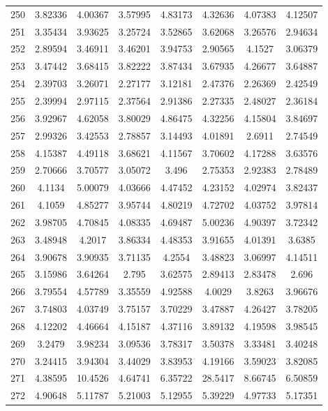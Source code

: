 \begin{center}
\begin{longtable}{cccccccc}
250 & 3.82336 & 4.00367 & 3.57995 & 4.83173 & 4.32636 & 4.07383 & 4.12507\\
251 & 3.35434 & 3.93625 & 3.25724 & 3.52865 & 3.62068 & 3.26576 & 2.94634\\
252 & 2.89594 & 3.46911 & 3.46201 & 3.94753 & 2.90565 & 4.1527 & 3.06379\\
253 & 3.47442 & 3.68415 & 3.82222 & 3.87434 & 3.67935 & 4.26677 & 3.64887\\
254 & 2.39703 & 3.26071 & 2.27177 & 3.12181 & 2.47376 & 2.26369 & 2.42549\\
255 & 2.39994 & 2.97115 & 2.37564 & 2.91386 & 2.27335 & 2.48027 & 2.36184\\
256 & 3.92967 & 4.62058 & 3.80029 & 4.86475 & 4.32256 & 4.15804 & 3.84697\\
257 & 2.99326 & 3.42553 & 2.78857 & 3.14493 & 4.01891 & 2.6911 & 2.74549\\
258 & 4.15387 & 4.49118 & 3.68621 & 4.11567 & 3.70602 & 4.17288 & 3.63576\\
259 & 2.70666 & 3.70577 & 3.05072 & 3.496 & 2.75353 & 2.92383 & 2.78489\\
260 & 4.1134 & 5.00079 & 4.03666 & 4.47452 & 4.23152 & 4.02974 & 3.82437\\
261 & 4.1059 & 4.85277 & 3.95744 & 4.80219 & 4.72702 & 4.03752 & 3.97814\\
262 & 3.98705 & 4.70845 & 4.08335 & 4.69487 & 5.00236 & 4.90397 & 3.72342\\
263 & 3.48948 & 4.2017 & 3.86334 & 4.48353 & 3.91655 & 4.01391 & 3.6385\\
264 & 3.90678 & 3.90935 & 3.71135 & 4.2554 & 3.48823 & 3.06997 & 4.14511\\
265 & 3.15986 & 3.64264 & 2.795 & 3.62575 & 2.89413 & 2.83478 & 2.696\\
266 & 3.79554 & 4.57789 & 3.35559 & 4.92588 & 4.0029 & 3.8263 & 3.96676\\
267 & 3.74803 & 4.03749 & 3.75157 & 3.70229 & 3.47887 & 4.26427 & 3.78205\\
268 & 4.12202 & 4.46664 & 4.15187 & 4.37116 & 3.89132 & 4.19598 & 3.98545\\
269 & 3.2479 & 3.98234 & 3.09536 & 3.78317 & 3.50378 & 3.33481 & 3.40248\\
270 & 3.24415 & 3.94304 & 3.44029 & 3.83953 & 4.19166 & 3.59023 & 3.82085\\
271 & 4.38595 & 10.4526 & 4.64741 & 6.35722 & 28.5417 & 8.66745 & 6.50859\\
272 & 4.90648 & 5.11787 & 5.21003 & 5.12955 & 5.39229 & 4.97733 & 5.17351\\

\end{longtable}
\end{center}
